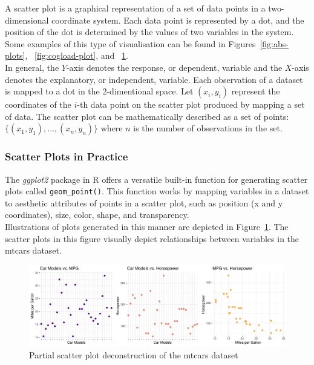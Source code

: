 \documentclass{article}\usepackage[]{graphicx}\usepackage[]{xcolor}
\makeatletter
\def\maxwidth{ %
  \ifdim\Gin@nat@width>\linewidth
    \linewidth
  \else
    \Gin@nat@width
  \fi
}
\newenvironment{knitrout}{}{} %
\numberwithin{equation}{section}
\makeatother
\begin{document}
A scatter plot is a graphical representation of a set of data points in a two-dimensional coordinate system. Each data point is represented by a dot, and the position of the dot is determined by the values of two variables in the system. Some examples of this type of visualisation can be found in Figures~\ref{fig:abs-plots}, ~\ref{fig:cogload-plot}, and ~\ref{fig:bubble-plot-construction}.\\

\noindent
In general, the \(Y\)-axis denotes the response, or dependent, variable and the \(X\)-axis denotes the explanatory, or independent, variable. Each observation of a dataset is mapped to a dot in the 2-dimentional space. Let \((x_i, y_i)\) represent the coordinates of the \(i\)-th data point on the scatter plot produced by mapping a set of data. The scatter plot can be mathematically described as a set of points: \( \{(x_1, y_1), \ldots, (x_n, y_n)\}\) where \(n\) is the number of observations in the set.

\subsubsection{Scatter Plots in Practice}

\noindent The \textit{ggplot2} package in R offers a versatile built-in function for generating scatter plots called \texttt{geom\_point()}. This function works by mapping variables in a dataset to aesthetic attributes of points in a scatter plot, such as position (x and y coordinates), size, color, shape, and transparency.\\

\noindent Illustrations of plots generated in this manner are depicted in Figure~\ref{fig:bubble-plot-construction}. The scatter plots in this figure visually depict relationships between variables in the mtcars dataset.\\

\begin{knitrout}\scriptsize
{}\color{fgcolor}\begin{figure}[H]

{\centering \includegraphics[width=\maxwidth]{figure/beamer-bubble-plot-construction-1} 

}

\caption[Partial scatter plot deconstruction of the mtcars dataset]{Partial scatter plot deconstruction of the mtcars dataset}\label{fig:bubble-plot-construction}
\end{figure}

\end{knitrout}
\end{document}

